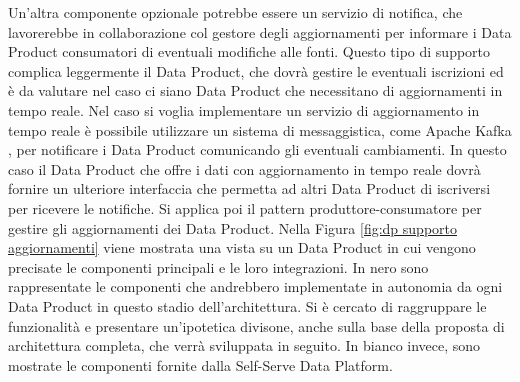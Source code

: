 \documentclass[a4paper,12pt]{report}
\begin{document}
Un'altra componente opzionale potrebbe essere un servizio di notifica, che lavorerebbe in collaborazione col gestore degli aggiornamenti per informare i Data Product consumatori di eventuali modifiche alle fonti. 
Questo tipo di supporto complica leggermente il Data Product, che dovrà gestire le eventuali iscrizioni ed è da valutare nel caso ci siano Data Product che necessitano di aggiornamenti in tempo reale.
Nel caso si voglia implementare un servizio di aggiornamento in tempo reale è possibile utilizzare un sistema di messaggistica, come Apache Kafka \cite{kafka_docs}, per notificare i Data Product comunicando gli eventuali cambiamenti.
In questo caso il Data Product che offre i dati con aggiornamento in tempo reale dovrà fornire un ulteriore interfaccia che permetta ad altri Data Product di iscriversi per ricevere le notifiche.
Si applica poi il pattern produttore-consumatore per gestire gli aggiornamenti dei Data Product.
Nella Figura \ref{fig:dp supporto aggiornamenti} viene mostrata una vista su un Data Product in cui vengono precisate le componenti principali e le loro integrazioni.
In nero sono rappresentate le componenti che andrebbero implementate in autonomia da ogni Data Product in questo stadio dell'architettura.
Si è cercato di raggruppare le funzionalità e presentare un'ipotetica divisone, anche sulla base della proposta di architettura completa, che verrà sviluppata in seguito.
In bianco invece, sono mostrate le componenti fornite dalla Self-Serve Data Platform. 
\end{document}
